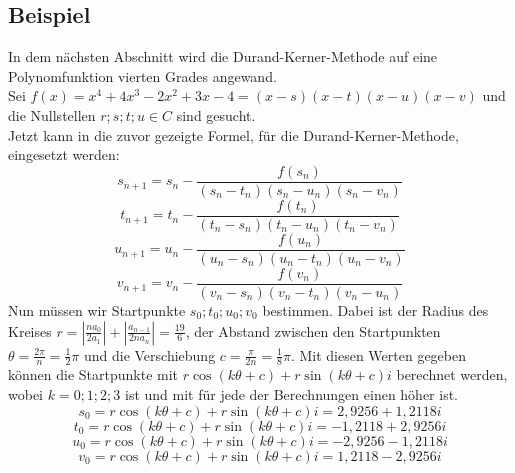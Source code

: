 \documentclass[12pt]{article}
\begin{document}
    \subsection{Beispiel}
        In dem nächsten Abschnitt wird die Durand-Kerner-Methode auf eine Polynomfunktion vierten Grades angewand. \\
        Sei $f(x) = x^4 + 4x^3 - 2x^2 + 3x - 4 = (x-s)(x-t)(x-u)(x-v)$ und die Nullstellen $r;s;t;u \in C$ sind gesucht. \\
        Jetzt kann in die zuvor gezeigte Formel, für die Durand-Kerner-Methode, eingesetzt werden:
        \begin{displaymath}
            s_{n+1} = s_n-\frac{f(s_n)}{(s_n-t_n)(s_n-u_n)(s_n-v_n)}
        \end{displaymath}
        \begin{displaymath}
            t_{n+1} = t_n-\frac{f(t_n)}{(t_n-s_n)(t_n-u_n)(t_n-v_n)}
        \end{displaymath}
        \begin{displaymath}
            u_{n+1} = u_n-\frac{f(u_n)}{(u_n-s_n)(u_n-t_n)(u_n-v_n)}
        \end{displaymath}
        \begin{displaymath}
            v_{n+1} = v_n-\frac{f(v_n)}{(v_n-s_n)(v_n-t_n)(v_n-u_n)}
        \end{displaymath}
        Nun müssen wir Startpunkte $s_0;t_0;u_0;v_0$ bestimmen. Dabei ist der Radius des Kreises $r = |\frac{na_0}{2a_1}| + |\frac{a_{n-1}}{2na_n}| = \frac{19}{6}$, der Abstand zwischen den Startpunkten $\theta = \frac{2\pi}{n} = \frac{1}{2}\pi$ und die Verschiebung $c = \frac{\pi}{2n} = \frac{1}{8}\pi$. Mit diesen Werten gegeben können die Startpunkte mit $r \cos(k\theta+c) + r \sin(k\theta+c)i$ berechnet werden, wobei $k = {0;1;2;3}$ ist und mit für jede der Berechnungen einen höher ist.
        \begin{displaymath}
            s_0 = r \cos(k\theta+c) + r \sin(k\theta+c)i = 2,9256 + 1,2118i
        \end{displaymath}
        \begin{displaymath}
            t_0 = r \cos(k\theta+c) + r \sin(k\theta+c)i = -1,2118 + 2,9256i
        \end{displaymath}
        \begin{displaymath}
            u_0 = r \cos(k\theta+c) + r \sin(k\theta+c)i = -2,9256 - 1,2118i
        \end{displaymath}
        \begin{displaymath}
            v_0 = r \cos(k\theta+c) + r \sin(k\theta+c)i = 1,2118 - 2,9256i
        \end{displaymath}
\end{document}
